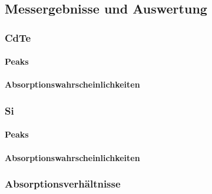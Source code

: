 \subsection{Messergebnisse und Auswertung}
\subsubsection{CdTe}
\paragraph{Peaks}
\paragraph{Absorptionswahrscheinlichkeiten}

\subsubsection{Si}
\paragraph{Peaks}
\paragraph{Absorptionswahrscheinlichkeiten}

\subsubsection{Absorptionsverhältnisse}